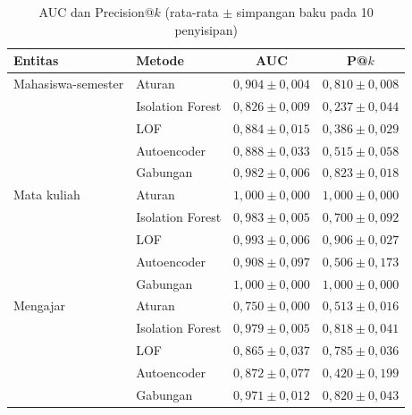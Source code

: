 \documentclass[conference]{IEEEtran}
\begin{document}
\begin{table}[htbp]
\caption{AUC dan Precision@$k$ (rata-rata $\pm$ simpangan baku pada 10 penyisipan)}
\begin{center}
\footnotesize\setlength{\tabcolsep}{3pt}
\begin{tabular}{llcc}
\toprule
\textbf{Entitas} & \textbf{Metode} & \textbf{AUC} & \textbf{P@$k$} \\
\midrule
Mahasiswa-semester & Aturan & $0{,}904\pm0{,}004$ & $0{,}810\pm0{,}008$ \\
 & Isolation Forest & $0{,}826\pm0{,}009$ & $0{,}237\pm0{,}044$ \\
 & LOF & $0{,}884\pm0{,}015$ & $0{,}386\pm0{,}029$ \\
 & Autoencoder & $0{,}888\pm0{,}033$ & $0{,}515\pm0{,}058$ \\
 & Gabungan & $0{,}982\pm0{,}006$ & $0{,}823\pm0{,}018$ \\
\midrule
Mata kuliah & Aturan & $1{,}000\pm0{,}000$ & $1{,}000\pm0{,}000$ \\
 & Isolation Forest & $0{,}983\pm0{,}005$ & $0{,}700\pm0{,}092$ \\
 & LOF & $0{,}993\pm0{,}006$ & $0{,}906\pm0{,}027$ \\
 & Autoencoder & $0{,}908\pm0{,}097$ & $0{,}506\pm0{,}173$ \\
 & Gabungan & $1{,}000\pm0{,}000$ & $1{,}000\pm0{,}000$ \\
\midrule
Mengajar & Aturan & $0{,}750\pm0{,}000$ & $0{,}513\pm0{,}016$ \\
 & Isolation Forest & $0{,}979\pm0{,}005$ & $0{,}818\pm0{,}041$ \\
 & LOF & $0{,}865\pm0{,}037$ & $0{,}785\pm0{,}036$ \\
 & Autoencoder & $0{,}872\pm0{,}077$ & $0{,}420\pm0{,}199$ \\
 & Gabungan & $0{,}971\pm0{,}012$ & $0{,}820\pm0{,}043$ \\
\bottomrule
\end{tabular}
\label{tab:auc}
\end{center}
\end{table}
\end{document}

